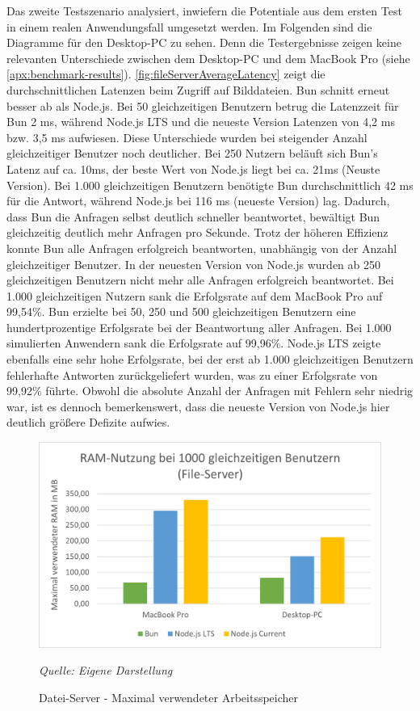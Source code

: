 \noindent
Das zweite Testszenario analysiert, inwiefern die Potentiale aus dem ersten Test in einem realen Anwendungsfall umgesetzt werden. Im Folgenden sind die Diagramme für den Desktop-PC zu sehen. Denn die Testergebnisse zeigen keine relevanten Unterschiede zwischen dem Desktop-PC und dem MacBook Pro (siehe \autoref{apx:benchmark-results}). \autoref{fig:fileServerAverageLatency} zeigt die durchschnittlichen Latenzen beim Zugriff auf Bilddateien. Bun schnitt erneut besser ab als Node.js. Bei 50 gleichzeitigen Benutzern betrug die Latenzzeit für Bun 2 ms, während Node.js LTS und die neueste Version Latenzen von 4,2 ms bzw. 3,5 ms aufwiesen. Diese Unterschiede wurden bei steigender Anzahl gleichzeitiger Benutzer noch deutlicher. Bei 250 Nutzern beläuft sich Bun's Latenz auf ca. 10ms, der beste Wert von Node.js liegt bei ca. 21ms (Neuste Version). Bei 1.000 gleichzeitigen Benutzern benötigte Bun durchschnittlich 42 ms für die Antwort, während Node.js bei 116 ms (neueste Version) lag. Dadurch, dass Bun die Anfragen selbst deutlich schneller beantwortet, bewältigt Bun gleichzeitig deutlich mehr Anfragen pro Sekunde. Trotz der höheren Effizienz konnte Bun alle Anfragen erfolgreich beantworten, unabhängig von der Anzahl gleichzeitiger Benutzer. In der neuesten Version von Node.js wurden ab 250 gleichzeitigen Benutzern nicht mehr alle Anfragen erfolgreich beantwortet. Bei 1.000 gleichzeitigen Nutzern sank die Erfolgsrate auf dem MacBook Pro auf 99,54\%. Bun erzielte bei 50, 250 und 500 gleichzeitigen Benutzern eine hundertprozentige Erfolgsrate bei der Beantwortung aller Anfragen. Bei 1.000 simulierten Anwendern sank die Erfolgsrate auf 99,96\%. Node.js LTS zeigte ebenfalls eine sehr hohe Erfolgsrate, bei der erst ab 1.000 gleichzeitigen Benutzern fehlerhafte Antworten zurückgeliefert wurden, was zu einer Erfolgsrate von 99,92\% führte. Obwohl die absolute Anzahl der Anfragen mit Fehlern sehr niedrig war, ist es dennoch bemerkenswert, dass die neueste Version von Node.js hier deutlich größere Defizite aufwies.\\

\begin{figure}[h!]
	\centering
	\includegraphics[width=\linewidth]{./images/fileServerRamUsage.png}
	\caption{Datei-Server - Maximal verwendeter Arbeitsspeicher}
	\label{fig:fileServerRamUsage}
	\textit{Quelle: Eigene Darstellung}
\end{figure}


